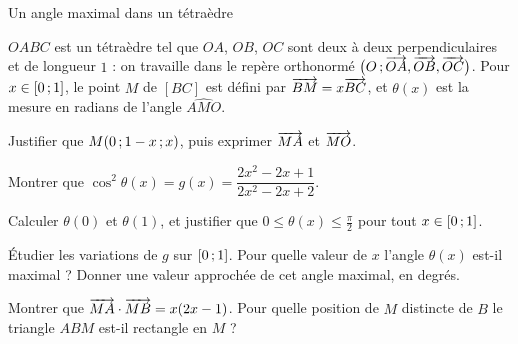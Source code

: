 \begin{exercice}[3]{Un angle maximal dans un tétraèdre}
\begin{codecote}[0.62]
$OABC$ est un tétraèdre tel que $OA$, $OB$, $OC$ sont deux à deux perpendiculaires et de longueur $1$ : on travaille dans le repère
orthonormé $\big(O\,{;}\,\overrightarrow{OA},\overrightarrow{OB},\overrightarrow{OC}\big)$. Pour $x\in\mathopen{[}0\,{;}\,1\mathclose{]}$, le point $M$ de $[BC]$ est défini par
$\overrightarrow{BM}=x\overrightarrow{BC}$, et $\theta(x)$ est la mesure en radians de l'angle $\widehat{AMO}$.
\begin{questions}
  \item Justifier que $M(0\,{;}\,1-x\,{;}\, x)$, puis exprimer $\overrightarrow{MA}$ et $\overrightarrow{MO}$.
  \item Montrer que $\cos^2\theta(x)=g(x)=\dfrac{2x^2-2x+1}{2x^2-2x+2}$.
\end{questions}
\cote
\centering
{}
\end{codecote}
\begin{questions}[start=3]
  \item Calculer $\theta(0)$ et $\theta(1)$, et justifier que $0\leq\theta(x)\leq\frac{\pi}{2}$ pour tout $x\in\mathopen{[}0\,{;}\,1\mathclose{]}$.
  \item Étudier les variations de $g$ sur $\mathopen{[}0\,{;}\,1\mathclose{]}$. Pour quelle valeur de $x$ l'angle $\theta(x)$ est-il maximal ? Donner une valeur
    approchée de cet angle maximal, en degrés.
  \item Montrer que $\overrightarrow{MA}\cdot\overrightarrow{MB}=x(2x-1)$. Pour quelle position de $M$ distincte de $B$ le triangle $ABM$ est-il rectangle en $M$ ?
\end{questions}
\end{exercice}

